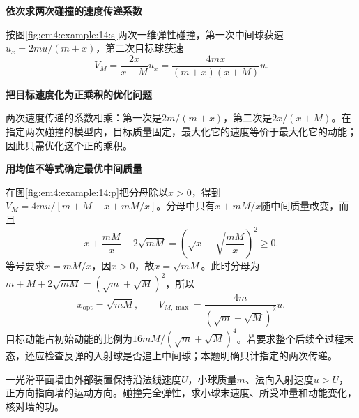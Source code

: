 \begin{solution}\textbf{依次求两次碰撞的速度传递系数}\par\nobreak
按图\ref{fig:em4:example:14:s}两次一维弹性碰撞，第一次中间球获速$u_x=2mu/(m+x)$，第二次目标球获速
\[V_M=\frac{2x}{x+M}u_x=\frac{4mx}{(m+x)(x+M)}u.\]



\par\medskip{}\noindent\textbf{把目标速度化为正乘积的优化问题}\par\nobreak
两次速度传递的系数相乘：第一次是$2m/(m+x)$，第二次是$2x/(x+M)$。在指定两次碰撞的模型内，目标质量固定，最大化它的速度等价于最大化它的动能；因此只需优化这个正的乘积。



\par\medskip{}\noindent\textbf{用均值不等式确定最优中间质量}\par\nobreak
在图\ref{fig:em4:example:14:p}把分母除以$x>0$，得到$V_M=4mu/[m+M+x+mM/x]$。分母中只有$x+mM/x$随中间质量改变，而且
\[
x+\frac{mM}{x}-2\sqrt{mM}
=\left(\sqrt x-\sqrt{\frac{mM}{x}}\right)^2\ge0.
\]
等号要求$x=mM/x$，因$x>0$，故$x=\sqrt{mM}$。此时分母为$m+M+2\sqrt{mM}=(\sqrt m+\sqrt M)^2$，所以
\[\boxed{x_{\mathrm{opt}}=\sqrt{mM},\qquad V_{M,\max}=\frac{4m}{(\sqrt m+\sqrt M)^2}u}.\]
目标动能占初始动能的比例为$16mM/(\sqrt m+\sqrt M)^4$。若要求整个后续全过程末态，还应检查反弹的入射球是否追上中间球；本题明确只计指定的两次传递。\end{solution}
\begin{question}\begin{example}[移动墙面的弹性反射]\label{em4:example:15}
一光滑平面墙由外部装置保持沿法线速度$U$，小球质量$m$、法向入射速度$u>U$，正方向指向墙的运动方向。碰撞完全弹性，求小球末速度、所受冲量和动能变化，核对墙的功。
\end{example}
\end{question}
